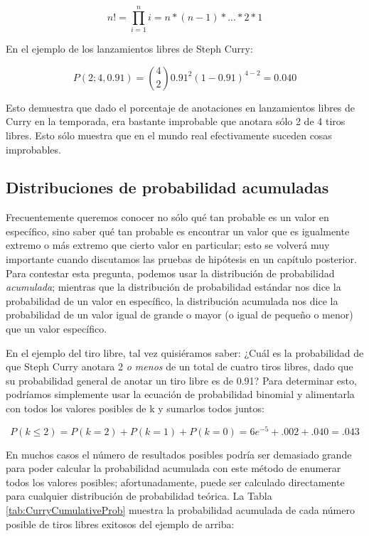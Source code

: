 \documentclass[
  12pt,
]{book}
\begin{document}
\[
n! = \prod_{i=1}^n i = n*(n-1)*...*2*1 
\]

En el ejemplo de los lanzamientos libres de Steph Curry:

\[
P(2;4,0.91) = \binom{4}{2} 0.91^2(1-0.91)^{4-2} = 0.040
\]

Esto demuestra que dado el porcentaje de anotaciones en lanzamientos libres de Curry en la temporada, era bastante improbable que anotara sólo 2 de 4 tiros libres. Esto sólo muestra que en el mundo real efectivamente suceden cosas improbables.

\hypertarget{distribuciones-de-probabilidad-acumuladas}{%
\subsection{Distribuciones de probabilidad acumuladas}\label{distribuciones-de-probabilidad-acumuladas}}

Frecuentemente queremos conocer no sólo qué tan probable es un valor en específico, sino saber qué tan probable es encontrar un valor que es igualmente extremo o más extremo que cierto valor en particular; esto se volverá muy importante cuando discutamos las pruebas de hipótesis en un capítulo posterior. Para contestar esta pregunta, podemos usar la distribución de probabilidad \emph{acumulada}; mientras que la distribución de probabilidad estándar nos dice la probabilidad de un valor en específico, la distribución acumulada nos dice la probabilidad de un valor igual de grande o mayor (o igual de pequeño o menor) que un valor específico.

En el ejemplo del tiro libre, tal vez quisiéramos saber: ¿Cuál es la probabilidad de que Steph Curry anotara 2 \emph{o menos} de un total de cuatro tiros libres, dado que su probabilidad general de anotar un tiro libre es de 0.91? Para determinar esto, podríamos simplemente usar la ecuación de probabilidad binomial y alimentarla con todos los valores posibles de k y sumarlos todos juntos:

\[
P(k\le2)= P(k=2) + P(k=1) + P(k=0) = 6e^{-5} + .002 + .040 = .043  
\]

En muchos casos el número de resultados posibles podría ser demasiado grande para poder calcular la probabilidad acumulada con este método de enumerar todos los valores posibles; afortunadamente, puede ser calculado directamente para cualquier distribución de probabilidad teórica. La Tabla \ref{tab:CurryCumulativeProb} muestra la probabilidad acumulada de cada número posible de tiros libres exitosos del ejemplo de arriba:
\end{document}
